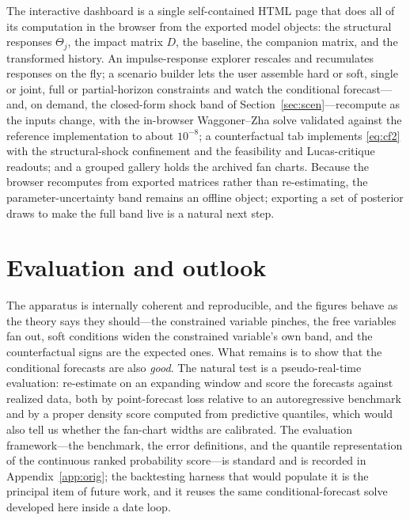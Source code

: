 \documentclass[11pt]{article}
\theoremstyle{remark}
\begin{document}
The interactive dashboard is a single self-contained HTML page that does all of
its computation in the browser from the exported model objects: the structural
responses $\Theta_j$, the impact matrix $D$, the baseline, the companion matrix,
and the transformed history. An impulse-response explorer rescales and recumulates
responses on the fly; a scenario builder lets the user assemble hard or soft,
single or joint, full or partial-horizon constraints and watch the conditional
forecast---and, on demand, the closed-form shock band of
Section~\ref{sec:scen}---recompute as the inputs change, with the in-browser
Waggoner--Zha solve validated against the reference implementation to about
$10^{-8}$; a counterfactual tab implements \eqref{eq:cf2} with the
structural-shock confinement and the feasibility and Lucas-critique readouts; and
a grouped gallery holds the archived fan charts. Because the browser recomputes
from exported matrices rather than re-estimating, the parameter-uncertainty band
remains an offline object; exporting a set of posterior draws to make the full
band live is a natural next step.

\section{Evaluation and outlook}\label{sec:oos}
The apparatus is internally coherent and reproducible, and the figures behave as
the theory says they should---the constrained variable pinches, the free variables
fan out, soft conditions widen the constrained variable's own band, and the
counterfactual signs are the expected ones. What remains is to show that the
conditional forecasts are also \emph{good}. The natural test is a pseudo-real-time
evaluation: re-estimate on an expanding window and score the forecasts against
realized data, both by point-forecast loss relative to an autoregressive benchmark
and by a proper density score computed from predictive quantiles, which would also
tell us whether the fan-chart widths are calibrated. The evaluation framework---the
benchmark, the error definitions, and the quantile representation of the continuous
ranked probability score---is standard and is recorded in Appendix~\ref{app:orig};
the backtesting harness that would populate it is the principal item of future
work, and it reuses the same conditional-forecast solve developed here inside a
date loop.
\end{document}
